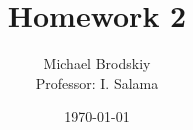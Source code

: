 


\title{Homework 2}
\date{\today}
\author{Michael Brodskiy\\ \small Professor: I. Salama}



\maketitle

